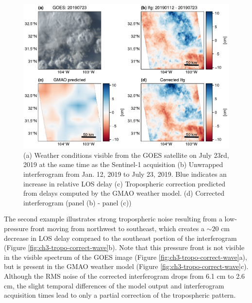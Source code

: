 \begin{figure}[!ht]
	\centering
	\includegraphics[width=1.0\textwidth]{figures/chapter3-sar/figure_tropo_correct_storm.pdf}
	\caption[West Texas tropospheric correction for thunderstorm]{
		(a) Weather conditions visible from the GOES satellite on July 23rd, 2019 at the same time as the Sentinel-1 acquisition
		(b) Unwrapped interferogram from Jan. 12, 2019 to July 23, 2019. Blue indicates an increase in relative LOS delay
		(c) Tropospheric correction predicted from delays computed by the GMAO weather model.
		(d) Corrected interferogram (panel (b) - panel (c))
	}
	\label{fig:ch3-tropo-correct-storm}
\end{figure}

The second example illustrates strong tropospheric noise resulting from a low-pressure front moving from northwest to southeast, which creates a $\sim 20$ cm decrease in LOS delay compraed to the southeast portion of the interferogram (Figure \ref{fig:ch3-tropo-correct-wave}b). Note that this pressure front is not visible in the visible spectrum of the GOES image (Figure \ref{fig:ch3-tropo-correct-wave}a), but is present in the GMAO weather model (Figure \ref{fig:ch3-tropo-correct-wave}c). Although the RMS noise of the corrected interferogram drops from 6.1 cm to 2.6 cm, the slight temporal differences of the model output and interferogram acquisition times lead to only a partial correction of the tropospheric pattern.


